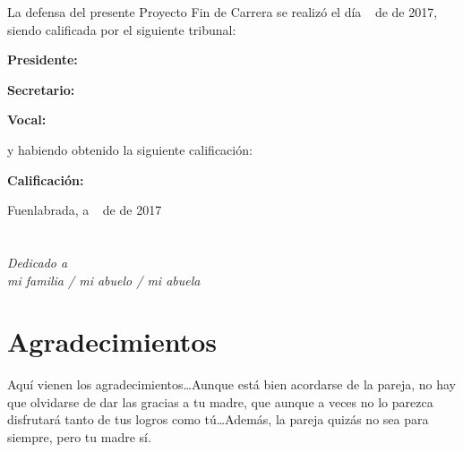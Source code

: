 \documentclass[a4paper, 12pt]{book}
\begin{document}
\vspace{1cm}
La defensa del presente Proyecto Fin de Carrera se realizó el día \qquad$\;\,$ de \qquad\qquad\qquad\qquad \newline de 2017, siendo calificada por el siguiente tribunal:


\vspace{0.5cm}
\textbf{Presidente:}

\vspace{1.2cm}
\textbf{Secretario:}

\vspace{1.2cm}
\textbf{Vocal:}


\vspace{1.2cm}
y habiendo obtenido la siguiente calificación:

\vspace{1cm}
\textbf{Calificación:}


\vspace{1cm}
\begin{flushright}
Fuenlabrada, a \qquad$\;\,$ de \qquad\qquad\qquad\qquad de 2017
\end{flushright}


\chapter*{}
\begin{flushright}
\textit{Dedicado a \\
mi familia / mi abuelo / mi abuela}
\end{flushright}


\chapter*{Agradecimientos}

Aquí vienen los agradecimientos\ldots Aunque está bien acordarse de la pareja,
no hay que olvidarse de dar las gracias a tu madre, que aunque a veces no lo 
parezca disfrutará tanto de tus logros como tú\ldots Además, la pareja quizás
no sea para siempre, pero tu madre sí.
\end{document}
